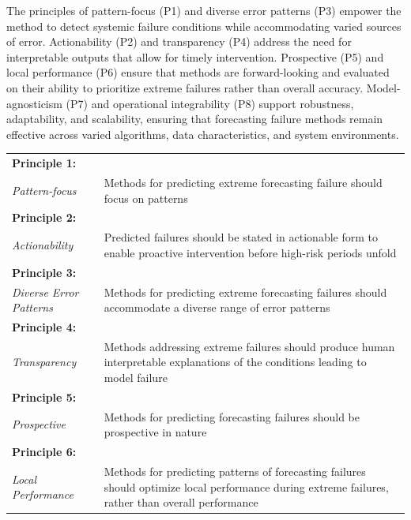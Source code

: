 \documentclass[12pt]{article}
\let\oldtable\table
\let\endoldtable\endtable
\renewenvironment{table}
  {\oldtable\spacingset{1}}
  {\endoldtable}
\begin{document}
The principles of pattern-focus (P1) and diverse error patterns (P3) empower the method to detect systemic failure conditions while accommodating varied sources of error. Actionability (P2) and transparency (P4) address the need for interpretable outputs that allow for timely intervention. Prospective (P5) and local performance (P6) ensure that methods are forward-looking and evaluated on their ability to prioritize extreme failures rather than overall accuracy. Model-agnosticism (P7) and operational integrability (P8) support robustness, adaptability, and scalability, ensuring that forecasting failure methods remain effective across varied algorithms, data characteristics, and system environments. 

\begin{table}
\centering
\caption{\textit{Guiding Principles for Methods that Forecast Forecasting Failures.}}
\small
\renewcommand{\arraystretch}{1.3}
\begin{tabular}{|m{2.7cm}|m{12.5cm}|}
\hline
\centering\textbf{Principle 1:} \\ \centering\textit{Pattern-focus} & Methods for predicting extreme forecasting failure should focus on patterns \\
\hline
\centering\textbf{Principle 2:} \\ \centering\textit{Actionability} & Predicted failures should be stated in actionable form to enable proactive intervention before high-risk periods unfold \\
\hline
\centering\textbf{Principle 3:} \\ \centering\textit{Diverse Error Patterns} & Methods for predicting extreme forecasting failures should accommodate a diverse range of error patterns \\
\hline
\centering\textbf{Principle 4:} \\ \centering\textit{Transparency} & Methods addressing extreme failures should produce human interpretable explanations of the conditions leading to model failure \\
\hline
\centering\textbf{Principle 5:} \\ \centering\textit{Prospective} & Methods for predicting forecasting failures should be prospective in nature \\
\hline
\centering\textbf{Principle 6:} \\ \centering\textit{Local Performance} & Methods for predicting patterns of forecasting failures should optimize local performance during extreme failures, rather than overall performance \\

\end{tabular}
\end{table}
\end{document}
